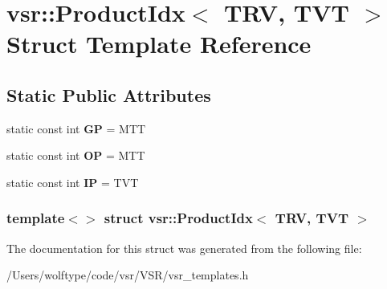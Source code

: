 \hypertarget{structvsr_1_1_product_idx_3_01_t_r_v_00_01_t_v_t_01_4}{\section{vsr\-:\-:Product\-Idx$<$ T\-R\-V, T\-V\-T $>$ Struct Template Reference}
\label{structvsr_1_1_product_idx_3_01_t_r_v_00_01_t_v_t_01_4}
}
\subsection*{Static Public Attributes}
\begin{DoxyCompactItemize}
\item 
\hypertarget{structvsr_1_1_product_idx_3_01_t_r_v_00_01_t_v_t_01_4_a764c2bf3a7589f9ce8b26f73b686425f}{static const int {\bfseries G\-P} = M\-T\-T}\label{structvsr_1_1_product_idx_3_01_t_r_v_00_01_t_v_t_01_4_a764c2bf3a7589f9ce8b26f73b686425f}

\item 
\hypertarget{structvsr_1_1_product_idx_3_01_t_r_v_00_01_t_v_t_01_4_a810334cda50aa9cdb9890a159217975a}{static const int {\bfseries O\-P} = M\-T\-T}\label{structvsr_1_1_product_idx_3_01_t_r_v_00_01_t_v_t_01_4_a810334cda50aa9cdb9890a159217975a}

\item 
\hypertarget{structvsr_1_1_product_idx_3_01_t_r_v_00_01_t_v_t_01_4_ad9799005d464ccaac063e405745a27c9}{static const int {\bfseries I\-P} = T\-V\-T}\label{structvsr_1_1_product_idx_3_01_t_r_v_00_01_t_v_t_01_4_ad9799005d464ccaac063e405745a27c9}

\end{DoxyCompactItemize}
\subsubsection*{template$<$$>$ struct vsr\-::\-Product\-Idx$<$ T\-R\-V, T\-V\-T $>$}



The documentation for this struct was generated from the following file\-:\begin{DoxyCompactItemize}
\item 
/\-Users/wolftype/code/vsr/\-V\-S\-R/vsr\-\_\-templates.\-h\end{DoxyCompactItemize}
